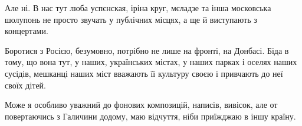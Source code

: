 Але ні. В нас тут люба успєнская, іріна круг, мєладзе та інша московська
шолупонь не просто звучать у публічних місцях, а ще й виступають з концертами.

Боротися з Росією, безумовно, потрібно не лише на фронті, на Донбасі. Біда в
тому, що вона тут, у наших, українських містах, у наших парках і оселях наших
сусідів, мешканці наших міст вважають її культуру своєю і привчають до неї
своїх дітей.

Може я особливо уважний до фонових композицій, написів, вивісок, але от
повертаючись з Галичини додому, маю відчуття, ніби приїжджаю в іншу країну.

